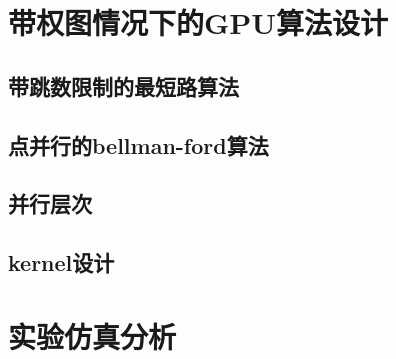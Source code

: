 \section{带权图情况下的GPU算法设计}
\subsection{带跳数限制的最短路算法}
\subsection{点并行的bellman-ford算法}
\subsection{并行层次}
\subsection{kernel设计}
\section{实验仿真分析}